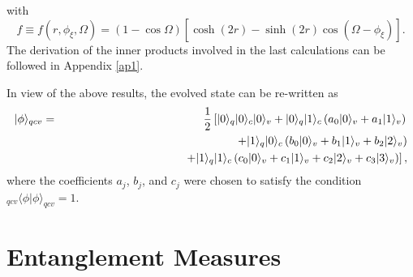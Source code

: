 with 
\begin{equation}\label{squeezing_function}
f \equiv f\left(r, \phi_{\xi}, \Omega\right)=\left(1-\cos\Omega\right)\left[\cosh\left(2r\right)-\sinh\left(2r\right)\cos\left(\Omega-\phi_{\xi}\right)\right].
\end{equation}
The derivation of the inner products involved in the last calculations can be followed in Appendix \ref{ap1}.

In view of the above results, the evolved state can be re-written as
\begin{eqnarray}\label{orthonormal_evolved_state_qcv}
|\phi\rangle_{qcv}&=&\frac{1}{2}\left[|0\rangle_{q}|0\rangle_{c}|0\rangle_{v}+|0\rangle_{q}|1\rangle_{c}\left(a_{0}|0\rangle_{v}+a_{1}|1\rangle_{v}\right)\right.\nonumber\\
                  &&\hspace{3cm}+|1\rangle_{q}|0\rangle_{c}\left(b_{0}|0\rangle_{v}+b_{1}|1\rangle_{v}+b_{2}|2\rangle_{v}\right)\nonumber\\                  
                  &&\hspace{3.7cm}\left.+|1\rangle_{q}|1\rangle_{c}\left(c_{0}|0\rangle_{v}+c_{1}|1\rangle_{v}+c_{2}|2\rangle_{v}+c_{3}|3\rangle_{v}\right)\right],
\end{eqnarray}
where the coefficients $a_{j}$, $b_{j}$, and $c_{j}$ were chosen to satisfy the condition $_{qcv}\langle \phi|\phi\rangle_{qcv}=1$.



\section{\label{sec:formalism1}Entanglement Measures}


